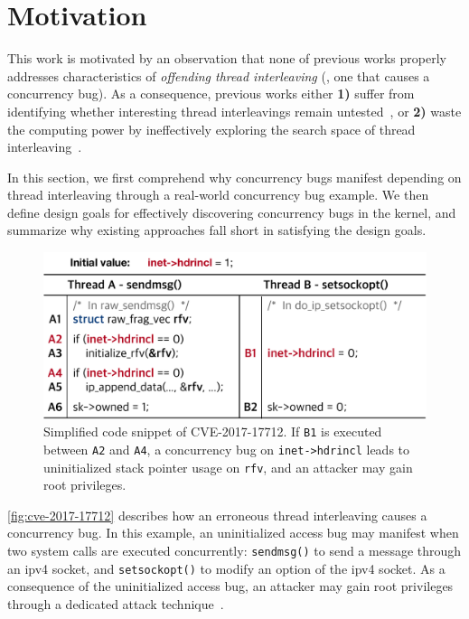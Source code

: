 \section{Motivation}
\label{s:motivation}


This work is motivated by an observation that none of previous works
properly addresses characteristics of \textit{offending thread
  interleaving} (\ie, one that causes a concurrency bug).
%
As a consequence, previous works either \textbf{1)} suffer from
identifying whether interesting thread interleavings remain
untested~\cite{krace, conzzer, muzz}, or \textbf{2)} waste the
computing power by ineffectively exploring the search space of thread
interleaving~\cite{snowboard, razzer}.



In this section, we first comprehend why concurrency bugs manifest
depending on thread interleaving through a real-world concurrency bug
example.
%
We then define design goals for effectively discovering concurrency
bugs in the kernel, and summarize why existing approaches fall short
in satisfying the design goals.


%
\begin{figure}[t]
  \centering
  \includegraphics[width=0.95\linewidth]{fig/cve-2017-10661.pdf}
  \caption{Simplified code snippet of CVE-2017-17712. If \texttt{B1} is
    executed between \texttt{A2} and \texttt{A4}, a concurrency bug on
    \texttt{inet->hdrincl} leads to uninitialized stack pointer usage
    on \texttt{rfv}, and an attacker may gain root privileges.}
  \label{fig:cve-2017-17712}
\end{figure}
%
\autoref{fig:cve-2017-17712} describes how an erroneous thread
interleaving causes a concurrency bug.
%
In this example, an uninitialized access bug may manifest when two
system calls are executed concurrently: \texttt{sendmsg()} to send a
message through an ipv4 socket, and \texttt{setsockopt()} to modify an
option of the ipv4 socket. As a consequence of the uninitialized
access bug, an attacker may gain root privileges through a dedicated
attack technique~\cite{stackspray}.



